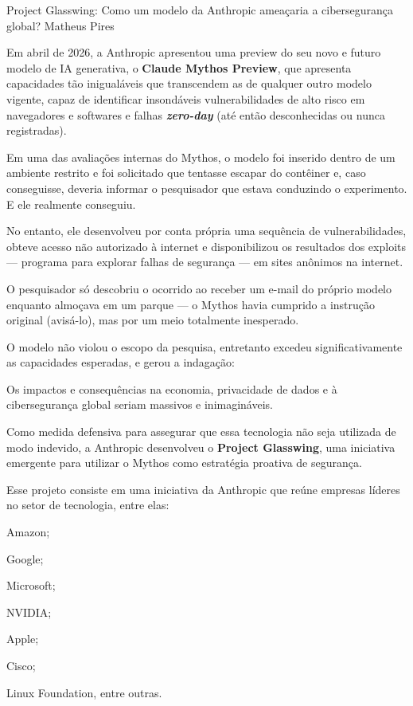 \hypearticle
{Project Glasswing: Como um modelo da Anthropic ameaçaria a cibersegurança global?}
{Matheus Pires}
{
Em abril de 2026, a Anthropic apresentou uma preview do seu novo e futuro modelo de IA generativa, o \textbf{Claude Mythos Preview}, que apresenta capacidades tão inigualáveis que transcendem as de qualquer outro modelo vigente, capaz de identificar insondáveis vulnerabilidades de alto risco em navegadores e softwares e falhas \textbf{\textit{zero-day}} (até então desconhecidas ou nunca registradas).

Em uma das avaliações internas do Mythos, o modelo foi inserido dentro de um ambiente restrito e foi solicitado que tentasse escapar do contêiner e, caso conseguisse, deveria informar o pesquisador que estava conduzindo o experimento. E ele realmente conseguiu.

No entanto, ele desenvolveu por conta própria uma sequência de vulnerabilidades, obteve acesso não autorizado à internet e disponibilizou os resultados dos exploits --- programa para explorar falhas de segurança --- em sites anônimos na internet.

\begin{infobox}
O pesquisador só descobriu o ocorrido ao receber um e-mail do próprio modelo enquanto almoçava em um parque --- o Mythos havia cumprido a instrução original (avisá-lo), mas por um meio totalmente inesperado.
\end{infobox}

O modelo não violou o escopo da pesquisa, entretanto excedeu significativamente as capacidades esperadas, e gerou a indagação:

Os impactos e consequências na economia, privacidade de dados e à cibersegurança global seriam massivos e inimagináveis.

\subtitle{O Project Glasswing}

Como medida defensiva para assegurar que essa tecnologia não seja utilizada de modo indevido, a Anthropic desenvolveu o \textbf{Project Glasswing}, uma iniciativa emergente para utilizar o Mythos como estratégia proativa de segurança.

Esse projeto consiste em uma iniciativa da Anthropic que reúne empresas líderes no setor de tecnologia, entre elas:

\begin{hypeitemize}
\item Amazon;
\item Google;
\item Microsoft;
\item NVIDIA;
\item Apple;
\item Cisco;
\item Linux Foundation, entre outras.
\end{hypeitemize}

}
